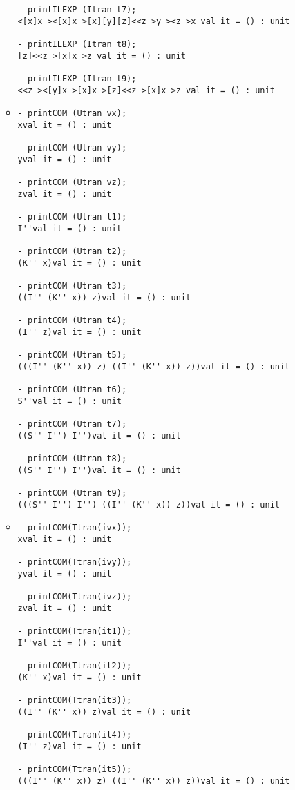 \documentclass[11pt]{article}
\begin{document}
\begin{enumerate}
\begin{itemize}
\begin{verbatim}
- printILEXP (Itran t7);
<[x]x ><[x]x >[x][y][z]<<z >y ><z >x val it = () : unit

- printILEXP (Itran t8);
[z]<<z >[x]x >z val it = () : unit

- printILEXP (Itran t9);
<<z ><[y]x >[x]x >[z]<<z >[x]x >z val it = () : unit

	      	      \end{verbatim}
	      	\item
	      	      \begin{verbatim}
- printCOM (Utran vx);
xval it = () : unit

- printCOM (Utran vy);
yval it = () : unit

- printCOM (Utran vz);
zval it = () : unit

- printCOM (Utran t1);
I''val it = () : unit

- printCOM (Utran t2);
(K'' x)val it = () : unit

- printCOM (Utran t3);
((I'' (K'' x)) z)val it = () : unit

- printCOM (Utran t4);
(I'' z)val it = () : unit

- printCOM (Utran t5);
(((I'' (K'' x)) z) ((I'' (K'' x)) z))val it = () : unit

- printCOM (Utran t6);
S''val it = () : unit

- printCOM (Utran t7);
((S'' I'') I'')val it = () : unit

- printCOM (Utran t8);
((S'' I'') I'')val it = () : unit

- printCOM (Utran t9);
(((S'' I'') I'') ((I'' (K'' x)) z))val it = () : unit

	      	      \end{verbatim}
	      	\item
	      	      \begin{verbatim}
- printCOM(Ttran(ivx));
xval it = () : unit

- printCOM(Ttran(ivy));
yval it = () : unit

- printCOM(Ttran(ivz));
zval it = () : unit

- printCOM(Ttran(it1));
I''val it = () : unit

- printCOM(Ttran(it2));
(K'' x)val it = () : unit

- printCOM(Ttran(it3));
((I'' (K'' x)) z)val it = () : unit

- printCOM(Ttran(it4));
(I'' z)val it = () : unit

- printCOM(Ttran(it5));
(((I'' (K'' x)) z) ((I'' (K'' x)) z))val it = () : unit


\end{verbatim}
\end{itemize}
\end{enumerate}
\end{document}
